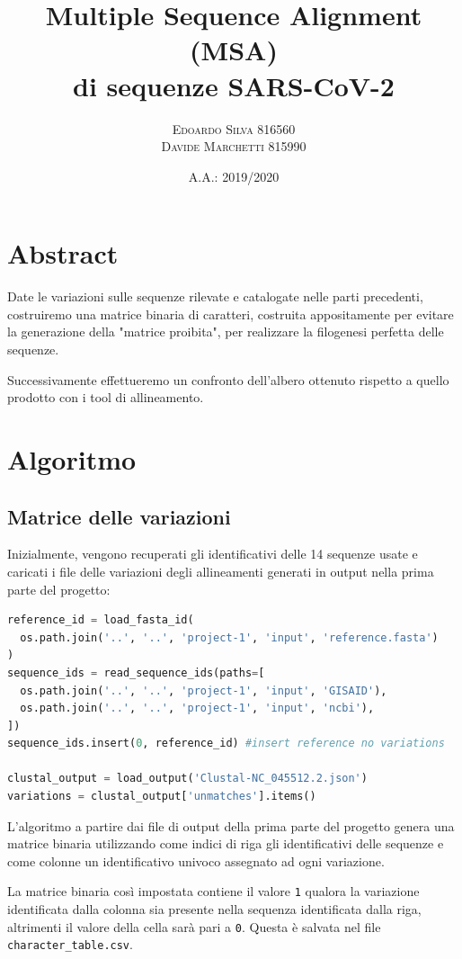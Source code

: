 \documentclass[11pt,italian]{article}
\title{Multiple Sequence Alignment (MSA) \\ di sequenze SARS-CoV-2}
\date{A.A.: 2019/2020}
\author{
    \textsc{Edoardo Silva} 816560 \\
    \textsc{Davide Marchetti} 815990
}
\begin{document}
\maketitle

\section{Abstract}
Date le variazioni sulle sequenze rilevate e catalogate nelle parti precedenti, costruiremo una matrice binaria di caratteri, costruita appositamente per evitare la generazione della "matrice proibita", per realizzare la filogenesi perfetta delle sequenze.

Successivamente effettueremo un confronto dell’albero ottenuto rispetto a quello prodotto con i tool di allineamento.

\newpage
\section{Algoritmo}
\subsection{Matrice delle variazioni}
Inizialmente, vengono recuperati gli identificativi delle 14 sequenze usate e caricati i file delle variazioni degli allineamenti generati in output nella prima parte del progetto:

\begin{lstlisting}[language=Python,caption=Caricamento dei file necessari per l'elaborazione,label=code:read_input_files]
reference_id = load_fasta_id(
  os.path.join('..', '..', 'project-1', 'input', 'reference.fasta')
)
sequence_ids = read_sequence_ids(paths=[
  os.path.join('..', '..', 'project-1', 'input', 'GISAID'),
  os.path.join('..', '..', 'project-1', 'input', 'ncbi'),
])
sequence_ids.insert(0, reference_id) #insert reference no variations

clustal_output = load_output('Clustal-NC_045512.2.json')
variations = clustal_output['unmatches'].items()
\end{lstlisting}

\noindent
L'algoritmo a partire dai file di output della prima parte del progetto genera una matrice binaria utilizzando come indici di riga gli identificativi delle sequenze e come colonne un identificativo univoco assegnato ad ogni variazione.

La matrice binaria così impostata contiene il valore \lstinline{1} qualora la variazione identificata dalla colonna sia presente nella sequenza identificata dalla riga, altrimenti il valore della cella sarà pari a \lstinline{0}.
Questa è salvata nel file \lstinline{character_table.csv}.
\end{document}
